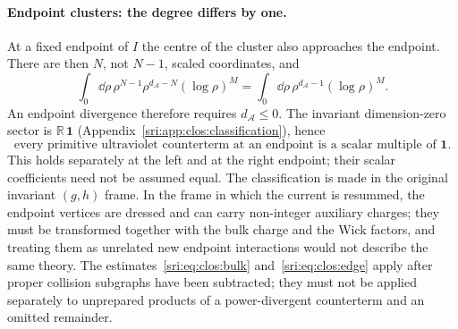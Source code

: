 \paragraph{Endpoint clusters: the degree differs by one.} At a fixed endpoint of $I$ the centre of the cluster also
approaches the endpoint. There are then $N$, not $N-1$, scaled coordinates, and
\begin{equation}
 \int_0\dd\rho\,\rho^{N-1}\rho^{d_{\mathcal A}-N}(\log\rho)^M=\int_0\dd\rho\,\rho^{d_{\mathcal A}-1}(\log\rho)^M .
 \label{sri:eq:clos:edge}
\end{equation}
An endpoint divergence therefore requires $d_{\mathcal A}\le0$. The invariant dimension-zero sector is
$\mathbb R\,\mathbf 1$ (Appendix~\ref{sri:app:clos:classification}), hence
\begin{equation}
 \text{every primitive ultraviolet counterterm at an endpoint is a scalar multiple of }\mathbf 1 .
 \label{sri:eq:clos:scalaredge}
\end{equation}
This holds separately at the left and at the right endpoint; their scalar coefficients need not be assumed equal. The
classification is made in the original invariant $(g,h)$ frame. In the frame in which the current is resummed, the
endpoint vertices are dressed and can carry non-integer auxiliary charges; they must be transformed together with the
bulk charge and the Wick factors, and treating them as unrelated new endpoint interactions would not describe the same
theory. The estimates~\eqref{sri:eq:clos:bulk} and~\eqref{sri:eq:clos:edge} apply after proper collision subgraphs have been
subtracted; they must not be applied separately to unprepared products of a power-divergent counterterm and an omitted
remainder.

